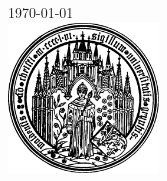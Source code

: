 \documentclass[
10pt, %
twoside, %
chapterinoneline,%
onehalfspacing, %
nolistspacing, %
parskip, %
headsepline, %
english,
]{MastersDoctoralThesis} %
\begin{document}
\begin{titlepage}
\begin{center}
		{\large \today}\\[4cm] %
		\includegraphics[width=0.3\textwidth]{images/logo.pdf} %
		
		\vfill
		
	\end{center}
	
\end{titlepage}



%
%


%	
%	
%	


%
%	
%	


\tableofcontents %



\end{document}
